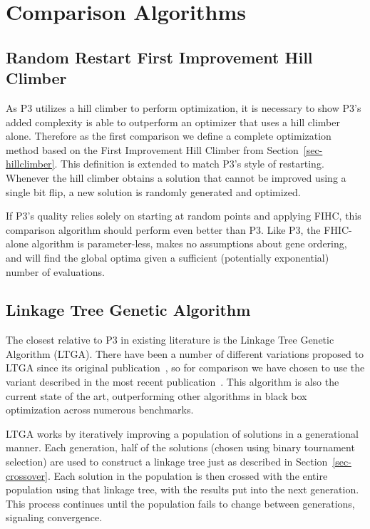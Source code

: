\documentclass{sig-alternate}
\begin{document}


\section{Comparison Algorithms}

\subsection{Random Restart First Improvement Hill Climber}

As P3 utilizes a hill climber to perform optimization, it is necessary
to show P3's added complexity is able to outperform an optimizer that
uses a hill climber alone.  Therefore as the first comparison we
define a complete optimization method based on the First Improvement
Hill Climber from Section~\ref{sec-hillclimber}.  This
definition is extended to match P3's style of restarting. Whenever the
hill climber obtains a solution that cannot be improved using a single
bit flip, a new solution is randomly generated and optimized.

If P3's quality relies solely on starting at random points and
applying FIHC, this comparison algorithm should perform even better
than P3.  Like P3, the FHIC-alone algorithm is parameter-less, makes no
assumptions about gene ordering, and will find the global optima given
a sufficient (potentially exponential) number of evaluations.

\subsection{Linkage Tree Genetic Algorithm}
\label{sec-ltga}
The closest relative to P3 in existing literature is the Linkage Tree Genetic Algorithm
(LTGA).  There have been a number of different variations proposed to LTGA since
its original publication~\cite{thierens:2010:ltga}, so for comparison we have chosen
to use the variant described in the most recent publication~\cite{thierens:2013:ltgahiff}.
This algorithm is also the current state of the art, outperforming other algorithms
in black box optimization across numerous benchmarks.

LTGA works by iteratively improving a population of solutions in a generational manner.
Each generation, half of the solutions (chosen using binary tournament selection)
are used to construct a linkage tree just as described in Section~\ref{sec-crossover}.
Each solution in the population is then crossed with the entire population using that
linkage tree, with the results put into the next generation.  This process continues
until the population fails to change between generations, signaling convergence.
\end{document}
